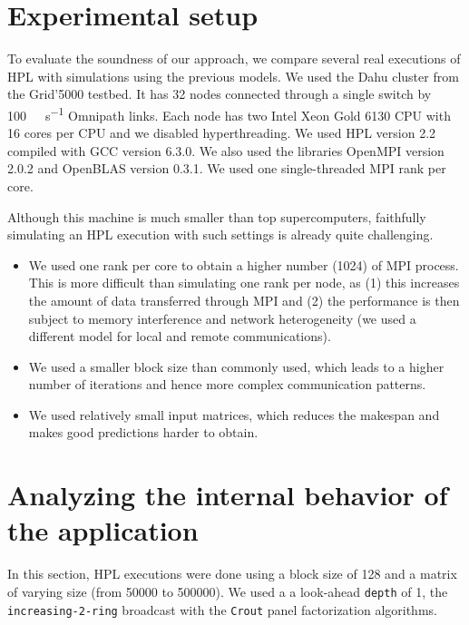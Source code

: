     \section{Experimental setup}%
    \label{sec:experimental_setup}
        To evaluate the soundness of our approach, we compare several real executions of HPL with simulations using the
        previous models.  We used the Dahu cluster from the Grid'5000 testbed. It has 32 nodes connected through a
        single switch by \SI{100}{\giga\bit\per\second} Omnipath links. Each node has two Intel Xeon Gold 6130 CPU with
        16 cores per CPU and we disabled hyperthreading.  We used HPL version 2.2 compiled with GCC version 6.3.0. We
        also used the libraries OpenMPI version 2.0.2 and OpenBLAS version 0.3.1. We used one single-threaded
        MPI rank per core.

        Although this machine is much smaller than top supercomputers,  faithfully simulating an HPL execution with such
        settings is already quite challenging.
        \begin{itemize}
        \item We used one rank per core to obtain a higher number (1024) of MPI process. This is more difficult than
            simulating one rank per node, as (1) this increases the amount of data transferred through MPI and (2) the
            performance is then subject to memory interference and network heterogeneity (we used a different model for
            local and remote communications).
        \item We used a smaller block size than commonly used, which leads to a higher number of iterations and hence
            more complex communication patterns.
        \item We used relatively small input matrices, which reduces the makespan and makes good predictions harder to
            obtain.
        \end{itemize}

    \section{Analyzing the internal behavior of the application}%
    \label{sec:internal_behavior}

        In this section, HPL executions were done using a block size of 128 and a matrix of varying size (from
        \num{50000} to \num{500000}). We used a a look-ahead \texttt{depth} of 1, the \texttt{increasing-2-ring}
        broadcast with the \texttt{Crout} panel factorization algorithms.

